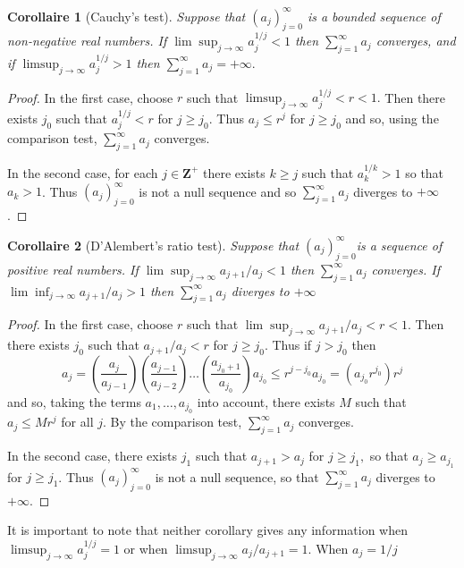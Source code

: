 \documentclass[12pt]{book}
\theoremstyle{definition}\newtheorem{dfn}{Définition}[chapter]
\theoremstyle{plain}\newtheorem{thm}{Théorème}[chapter]
\theoremstyle{plain}\newtheorem{prp}{Proposition}[chapter]
\theoremstyle{plain}\newtheorem{lem}{\bf Lemme}[chapter]
\theoremstyle{plain}\newtheorem{axm}{\bf Axiome}[chapter]
\theoremstyle{plain}\newtheorem{lmm}{\bf Lemme}[chapter]
\theoremstyle{plain}\newtheorem{exm}{\bf Example}[chapter]
\theoremstyle{plain}\newtheorem{cor}{\bf Corollaire}[chapter]
\theoremstyle{remark}\newtheorem{rem}{Remarque}[chapter]
\begin{document}
 \begin{cor}[Cauchy's test]
 Suppose that $\left(a_{j}\right)_{j=0}^{\infty}$ is a bounded sequence of non-negative real numbers. If $\lim \sup _{j \rightarrow \infty} a_{j}^{1 / j}<1$ then $\sum_{j=1}^{\infty} a_{j}$
converges, and if $\limsup _{j \rightarrow \infty} a_{j}^{1 / j}>1$ then $\sum_{j=1}^{\infty} a_{j}=+\infty .$
 \end{cor}
\begin{proof}
In the first case, choose $r$ such that $\limsup _{j \rightarrow \infty} a_{j}^{1 / j}<r<1 .$ Then there exists $j_{0}$ such that $a_{j}^{1 / j}<r$ for $j \geq j_{0}$. Thus $a_{j} \leq r^{j}$ for $j \geq j_{0}$ and so, using the comparison test, $\sum_{j=1}^{\infty} a_{j}$ converges.

In the second case, for each $j \in \mathbf{Z}^{+}$ there exists $k \geq j$ such that $a_{k}^{1 / k}>1$ so that $a_{k}>1$. Thus $\left(a_{j}\right)_{j=0}^{\infty}$ is not a null sequence and so $\sum_{j=1}^{\infty} a_{j}$ diverges to $+\infty$.
\end{proof}
\begin{cor}[D'Alembert's ratio test]
Suppose that $\left(a_{j}\right)_{j=0}^{\infty}$is a sequence of positive real numbers. If $\lim \sup _{j \rightarrow \infty} a_{j+1} / a_{j}<1$ then $\sum_{j=1}^{\infty} a_{j}$
converges. If $\lim \inf _{j \rightarrow \infty} a_{j+1} / a_{j}>1$ then $\sum_{j=1}^{\infty} a_{j}$ diverges to $+\infty$
\end{cor}
\begin{proof}
	In the first case, choose $r$ such that $\lim \sup _{j \rightarrow \infty} a_{j+1} / a_{j}<r<1$. Then there exists $j_{0}$ such that $a_{j+1} / a_{j}<r$ for $j \geq j_{0} .$ Thus if $j>j_{0}$ then
	$$
	a_{j}=\left(\frac{a_{j}}{a_{j-1}}\right)\left(\frac{a_{j-1}}{a_{j-2}}\right) \ldots\left(\frac{a_{j_{0}+1}}{a_{j_{0}}}\right) a_{j_{0}} \leq r^{j-j_{0}} a_{j_{0}}=\left(a_{j_{0}} r^{j_{0}}\right) r^{j}
	$$
	and so, taking the terms $a_{1}, \ldots, a_{j_{0}}$ into account, there exists $M$ such that $a_{j} \leq M r^{j}$ for all $j .$ By the comparison test, $\sum_{j=1}^{\infty} a_{j}$ converges.
	
	In the second case, there exists $j_{1}$ such that $a_{j+1}>a_{j}$ for $j \geq j_{1},$ so that $a_{j} \geq a_{j_{1}}$ for $j \geq j_{1}$. Thus $\left(a_{j}\right)_{j=0}^{\infty}$ is not a null sequence, so that $\sum_{j=1}^{\infty} a_{j}$ diverges to $+\infty$.
\end{proof}
It is important to note that neither corollary gives any information when $\limsup _{j \rightarrow \infty} a_{j}^{1 / j}=1$ or when $\limsup _{j \rightarrow \infty} a_{j} / a_{j+1}=1 .$ When $a_{j}=1 / j$
\end{document}
